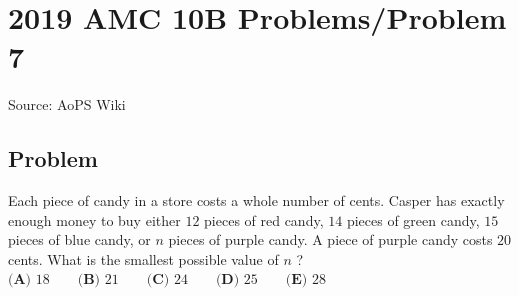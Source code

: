 \documentclass[12pt]{article}
\begin{document}
\section*{{2019 AMC 10B Problems/Problem 7}}
Source: AoPS Wiki

\subsection*{Problem}
Each piece of candy in a store costs a whole number of cents. Casper has exactly enough money to buy either $12$ pieces of red candy, $14$ pieces of green candy, $15$ pieces of blue candy, or $n$ pieces of purple candy. A piece of purple candy costs $20$ cents. What is the smallest possible value of $n$ ? $\textbf{(A) } 18 \qquad \textbf{(B) } 21 \qquad \textbf{(C) } 24\qquad \textbf{(D) } 25 \qquad \textbf{(E) } 28$
\end{document}
